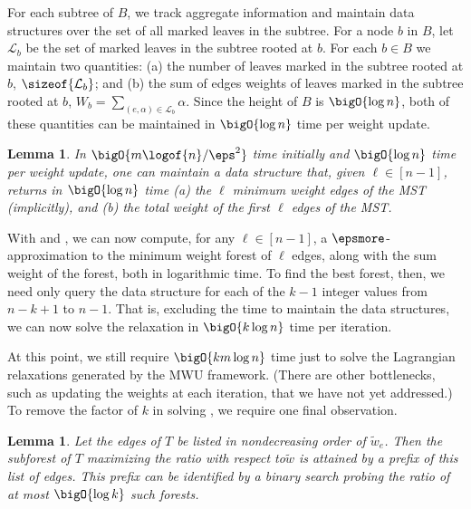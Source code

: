 \documentclass[11pt]{article}
\numberwithin{equation}{section}
\newtheorem{lemma}[theorem]{Lemma}
\theoremstyle{definition}
\theoremstyle{plain}
\newcommand{\leavesof}[1]{\mathcal{L}_{#1}}
\newcommand{\apxweight}{\tilde{w}}%
\newcommand{\apxweightof}[1]{\apxweight_{#1}}%
\newcommand{\wrt}{with respect to\xspace} %
\begin{document}
For each subtree of $B$, we track aggregate information and maintain
data structures over the set of all marked leaves in the subtree. For
a node $b$ in $B$, let $\leavesof{b}$ be the set of marked leaves in the
subtree rooted at $b$. For each $b \in B$ we maintain two quantities:
(a) the number of leaves marked in the subtree rooted at $b$,
$\sizeof{\leavesof{b}}$; and (b) the sum of edges weights of leaves
marked in the subtree rooted at $b$,
$W_b = \sum_{(e,\alpha) \in \leavesof{b}} \alpha$. Since the height of
$B$ is $\bigO{\log n}$, both of these quantities can be maintained in
$\bigO{\log n}$ time per weight update.

\begin{lemma}
  In $\bigO{m \logof{n} / \eps^2}$ time initially and $\bigO{\log n}$
  time per weight update, one can maintain a data structure that,
  given $\ell \in [n-1]$, returns in $\bigO{\log n}$ time (a) the
  $\ell$ minimum weight edges of the MST (implicitly), and (b) the
  total weight of the first $\ell$ edges of the MST.
\end{lemma}

With  and , we can now
compute, for any $\ell \in [n-1]$, a $\epsmore$-approximation to the
minimum weight forest of $\ell$ edges, along with the sum weight of
the forest, both in logarithmic time. To find the best forest, then,
we need only query the data structure for each of the $k-1$ integer
values from $n - k + 1$ to $n - 1$. That is, excluding the time to
maintain the data structures, we can now solve the relaxation
 in $\bigO{k \log n}$ time per iteration.

At this point, we still require $\bigO{k m \log n}$ time just to solve
the Lagrangian relaxations  generated by the
MWU framework. (There are other bottlenecks, such as updating the
weights at each iteration, that we have not yet addressed.) To remove
the factor of $k$ in solving , we require one
final observation.

\begin{lemma}
   Let the edges of $T$ be listed in
  nondecreasing order of $\apxweightof{e}$. Then the subforest of $T$
  maximizing the ratio  \wrt $\apxweight$ is
  attained by a prefix of this list of edges. This prefix can be
  identified by a binary search probing the ratio of at most
  $\bigO{\log k}$ such forests.
\end{lemma}
\end{document}
